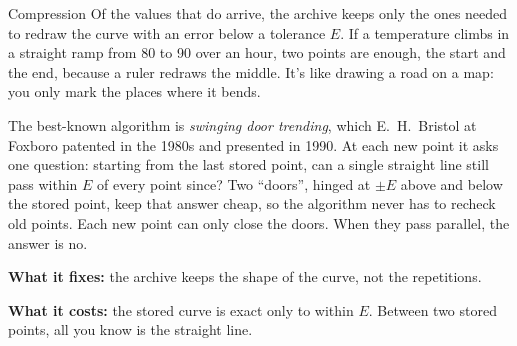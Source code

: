 \begin{concept}{Compression}
Of the values that do arrive, the archive keeps only the ones needed to redraw
the curve with an error below a tolerance $E$. If a temperature climbs in a
straight ramp from 80 to 90 over an hour, two points are enough, the start and
the end, because a ruler redraws the middle. It's like drawing a road on a map:
you only mark the places where it bends.

The best-known algorithm is \emph{swinging door trending}, which E.~H.\ Bristol
at Foxboro patented in the 1980s and presented in 1990. At each new point it
asks one question: starting from the last stored point, can a single straight
line still pass within $E$ of every point since? Two ``doors'', hinged at $\pm
E$ above and below the stored point, keep that answer cheap, so the algorithm
never has to recheck old points. Each new point can only close the doors. When
they pass parallel, the answer is no.

\textbf{What it fixes:} the archive keeps the shape of the curve, not the
repetitions.

\textbf{What it costs:} the stored curve is exact only to within $E$. Between
two stored points, all you know is the straight line.
\end{concept}

